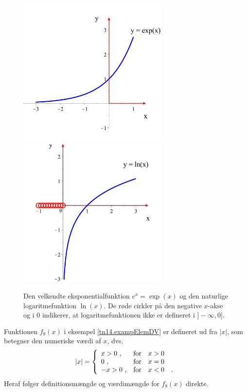 \begin{figure}[h]
\centerline{\includegraphics[width=75mm]{FIGS/plotexp02.pdf} \includegraphics[width=75mm]{FIGS/plotln.pdf}}
\begin{center}
\caption{Den velkendte eksponentialfunktion $e^{x} = \exp(x)$ og den naturlige logaritmefunktion $\ln(x)$. De røde cirkler på den negative $x$-akse og i $0$ indikerer, at logaritmefunktionen ikke er defineret i $]-\infty, 0]$. } \label{tn14.figExpLn}
\end{center}
\end{figure}



\begin{think}
Funktionen $f_{8}(x)$ i eksempel \ref{tn14.exampElemDV} er defineret ud fra $|x|$, som betegner den numeriske værdi af $x$, dvs.
\begin{equation}
|x| = \left\{
        \begin{array}{ll}
          x > 0 \, \, , & \hbox{for} \quad x > 0 \\
          0 \, \,, & \hbox{for} \quad x = 0 \\
          -x >0 \, \,, & \hbox{for} \quad x < 0  \quad.
        \end{array}
      \right.
\end{equation}
Heraf følger definitionsmængde og værdimængde for $f_{8}(x)$ direkte.
\end{think}

